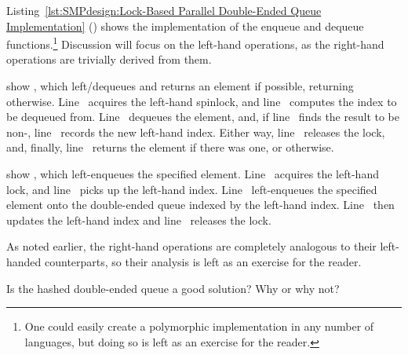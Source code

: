 Listing~\ref{lst:SMPdesign:Lock-Based Parallel Double-Ended Queue Implementation}
()
shows the implementation of the enqueue and dequeue functions.\footnote{
	One could easily create a polymorphic implementation in any
	number of languages, but doing so is left as an exercise for
	the reader.}
Discussion will focus on the left-hand operations, as the right-hand
operations are trivially derived from them.

\begin{fcvref}
 show ,
which left\-/dequeues and returns
an element if possible, returning  otherwise.
Line~ acquires the left-hand spinlock,
and line~ computes the
index to be dequeued from.
Line~ dequeues the element, and,
if line~ finds the result to be
non-, line~ records the new left-hand index.
Either way, line~ releases the lock, and,
finally, line~ returns
the element if there was one, or  otherwise.
\end{fcvref}

\begin{fcvref}
 show ,
which left-enqueues the specified
element.
Line~ acquires the left-hand lock,
and line~ picks up the left-hand
index.
Line~ left-enqueues the specified element
onto the double-ended queue
indexed by the left-hand index.
Line~ then updates the left-hand index
and line~ releases the lock.
\end{fcvref}

As noted earlier, the right-hand operations are completely analogous
to their left-handed counterparts, so their analysis is left as an
exercise for the reader.

\QuickQuiz{}
	Is the hashed double-ended queue a good solution?
	Why or why not?
 \QuickQuizEnd

